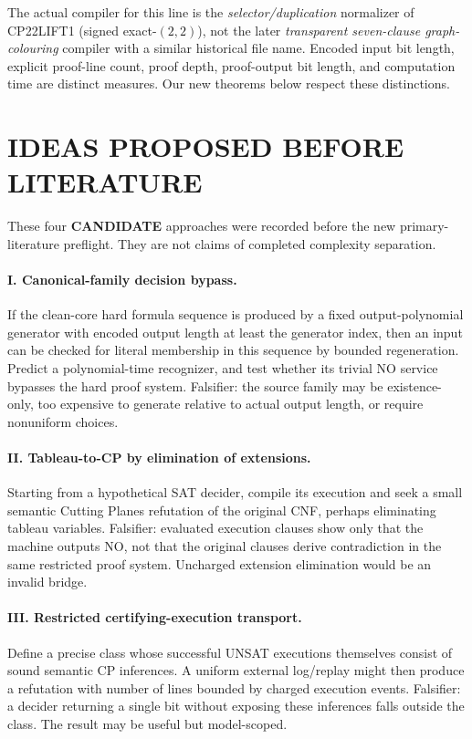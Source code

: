 \documentclass[11pt]{article}
\newcommand{\CAND}{\textbf{CANDIDATE}}
\begin{document}
The actual compiler for this line is the \emph{selector/duplication}
normalizer of CP22LIFT1 (signed exact-$(2,2)$), not the later
\emph{transparent seven-clause graph-colouring} compiler with a similar
historical file name. Encoded input bit length, explicit proof-line count,
proof depth, proof-output bit length, and computation time are distinct
measures. Our new theorems below respect these distinctions.

\section{IDEAS PROPOSED BEFORE LITERATURE}
These four \CAND{} approaches were recorded before the new primary-literature
preflight. They are not claims of completed complexity separation.

\paragraph{I. Canonical-family decision bypass.}
If the clean-core hard formula sequence is produced by a fixed
output-polynomial generator with encoded output length at least the
generator index, then an input can be checked for literal membership in
this sequence by bounded regeneration. Predict a polynomial-time recognizer,
and test whether its trivial NO service bypasses the hard proof system.
Falsifier: the source family may be existence-only, too expensive to generate
relative to actual output length, or require nonuniform choices.

\paragraph{II. Tableau-to-CP by elimination of extensions.}
Starting from a hypothetical SAT decider, compile its execution
and seek a small semantic Cutting Planes refutation of the original CNF,
perhaps eliminating tableau variables. Falsifier: evaluated execution
clauses show only that the machine outputs NO, not that the original clauses
derive contradiction in the same restricted proof system. Uncharged
extension elimination would be an invalid bridge.

\paragraph{III. Restricted certifying-execution transport.}
Define a precise class whose successful UNSAT executions themselves consist
of sound semantic CP inferences. A uniform external log/replay might then
produce a refutation with number of lines bounded by charged execution
events. Falsifier: a decider returning a single bit without exposing these
inferences falls outside the class. The result may be useful but model-scoped.
\end{document}
